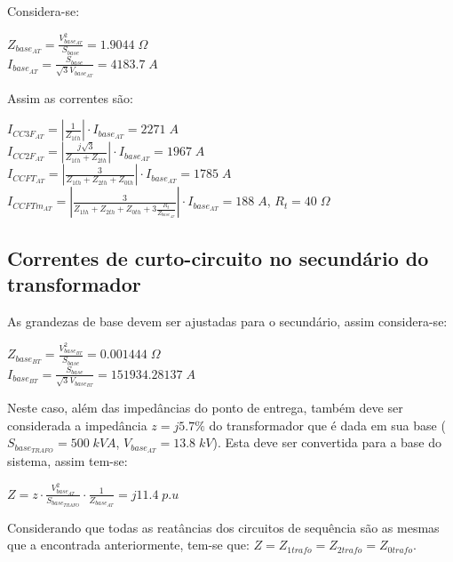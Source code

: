 Considera-se: 

\begin{flushleft}
$Z_{base_{AT}} = \frac{V_{base_{AT}}^2}{S_{base}} = 1.9044 \; \Omega$ \\ \vspace{5pt}
$I_{base_{AT}} = \frac{S_{base}}{\sqrt{3}V_{base_{AT}}} = 4183.7 \; A$ 
\end{flushleft}

Assim as correntes são:

\begin{flushleft}
$I_{CC3F_{AT}} = \left|\frac{1}{Z_{1th}}\right| \cdot I_{base_{AT}} = 2271 \; A$ \\
$I_{CC2F_{AT}} = \left|\frac{j\sqrt{3}}{Z_{1th}+Z_{2th}}\right| \cdot I_{base_{AT}} = 1967 \; A$ \\
$I_{CCFT_{AT}} = \left|\frac{3}{Z_{1th}+Z_{2th}+Z_{0th}}\right| \cdot I_{base_{AT}} = 1785 \; A$ \\
$I_{CCFTm_{AT}} = \left|\frac{3}{Z_{1th}+Z_{2th}+Z_{0th}+3\frac{R_t}{Z_{base_{AT}}}}\right| \cdot I_{base_{AT}} = 188 \; A$, $R_t = 40 \; \Omega$ 
\end{flushleft}

\subsection{Correntes de curto-circuito no secundário do transformador}

As grandezas de base devem ser ajustadas para o secundário, assim considera-se:

\begin{flushleft}
$Z_{base_{BT}} = \frac{V_{base_{BT}}^2}{S_{base}} = 0.001444 \; \Omega$ \\ \vspace{5pt}
$I_{base_{BT}} = \frac{S_{base}}{\sqrt{3}V_{base_{BT}}} = 151934.28137 \; A$ 
\end{flushleft}

Neste caso, além das impedâncias do ponto de entrega, também deve ser considerada a impedância $z=j5.7\%$ do transformador que é dada em sua base ($S_{base_{TRAFO}} = 500 \; kVA$, $V_{base_{AT}} = 13.8 \; kV$). Esta deve ser convertida para a base do sistema, assim tem-se:

\begin{flushleft}
$Z = z \cdot \frac{V_{base_{AT}}^2}{S_{base_{TRAFO}}} \cdot \frac{1}{Z_{base_{AT}}} = j11.4 \; p.u$ 
\end{flushleft}

Considerando que todas as reatâncias dos circuitos de sequência são as mesmas que a encontrada anteriormente, tem-se que: $Z = Z_{1trafo} = Z_{2trafo} = Z_{0trafo}$.

